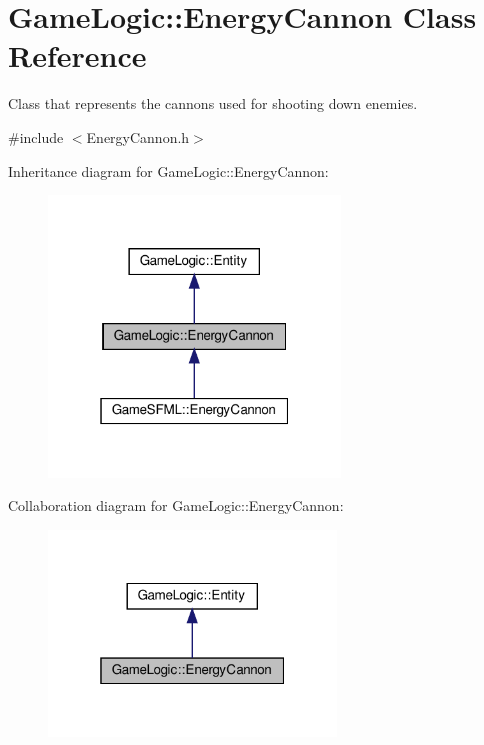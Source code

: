 \hypertarget{classGameLogic_1_1EnergyCannon}{}\section{Game\+Logic\+:\+:Energy\+Cannon Class Reference}
\label{classGameLogic_1_1EnergyCannon}


Class that represents the cannons used for shooting down enemies.  




{\ttfamily \#include $<$Energy\+Cannon.\+h$>$}



Inheritance diagram for Game\+Logic\+:\+:Energy\+Cannon\+:\nopagebreak
\begin{figure}[H]
\begin{center}
\leavevmode
\includegraphics[width=220pt]{classGameLogic_1_1EnergyCannon__inherit__graph}
\end{center}
\end{figure}


Collaboration diagram for Game\+Logic\+:\+:Energy\+Cannon\+:\nopagebreak
\begin{figure}[H]
\begin{center}
\leavevmode
\includegraphics[width=217pt]{classGameLogic_1_1EnergyCannon__coll__graph}
\end{center}
\end{figure}
